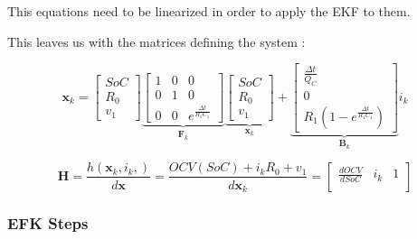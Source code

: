
This equations need to be linearized in order to apply the EKF to them. 

This leaves us with the matrices defining the system : 

\begin{equation}
 \boldsymbol x_k = 
  \begin{bmatrix}
  SoC \\
  R_0 \\
  v_1
  \end{bmatrix}   
 \underbrace{  
 \begin{bmatrix}
 1 & 0 & 0\\
 0 & 1 & 0\\
 0 & 0 & e^\frac{\Delta t}{R_1 C_1}
 \end{bmatrix}}_{\boldsymbol F_k}
 \underbrace{ 
 \begin{bmatrix}
 SoC \\
 R_0 \\
 v_1
 \end{bmatrix}}_{\boldsymbol x_k}  
 +
 \underbrace{
 \begin{bmatrix}
 \frac{\Delta t}{Q_C} \\
 0 \\
 R_1 (1-e^\frac{\Delta t}{R_1 C_1})
 \end{bmatrix}}_{\boldsymbol B_k}  i_k
  
\end{equation}

\begin{equation}
\boldsymbol H = \frac{h({\boldsymbol {x}}_{k}, {i}_{k},)} {d \boldsymbol {x}}  =  \frac{OCV(SoC) + i_k R_0  +  v_1}{d\boldsymbol {x}_{k}} = 
\begin{bmatrix}
 \frac{dOCV}{dSoC} &  i_k  & 1\\
\end{bmatrix}

\end{equation}


\subsubsection{EFK Steps}

